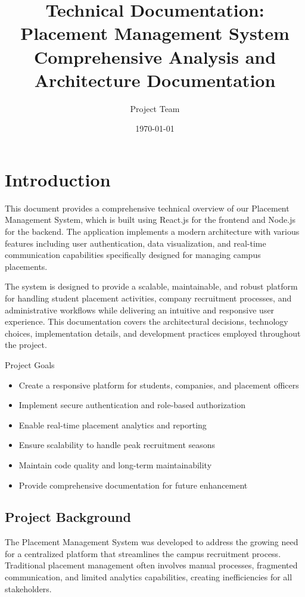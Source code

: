 \documentclass[12pt,a4paper]{article}
\title{\Huge{\textbf{Technical Documentation:}}\\ \huge{Placement Management System}\\ \Large{Comprehensive Analysis and Architecture Documentation}}
\author{Project Team}
\date{\today}
\begin{document}
\maketitle
\tableofcontents
\newpage

\section{Introduction}
\begin{multicols}{2}
This document provides a comprehensive technical overview of our Placement Management System, which is built using React.js for the frontend and Node.js for the backend. The application implements a modern architecture with various features including user authentication, data visualization, and real-time communication capabilities specifically designed for managing campus placements.

The system is designed to provide a scalable, maintainable, and robust platform for handling student placement activities, company recruitment processes, and administrative workflows while delivering an intuitive and responsive user experience. This documentation covers the architectural decisions, technology choices, implementation details, and development practices employed throughout the project.

\begin{infobox}{Project Goals}
\begin{itemize}
    \item Create a responsive platform for students, companies, and placement officers
    \item Implement secure authentication and role-based authorization
    \item Enable real-time placement analytics and reporting
    \item Ensure scalability to handle peak recruitment seasons
    \item Maintain code quality and long-term maintainability
    \item Provide comprehensive documentation for future enhancement
\end{itemize}
\end{infobox}
\end{multicols}

\subsection{Project Background}
The Placement Management System was developed to address the growing need for a centralized platform that streamlines the campus recruitment process. Traditional placement management often involves manual processes, fragmented communication, and limited analytics capabilities, creating inefficiencies for all stakeholders.
\end{document}

